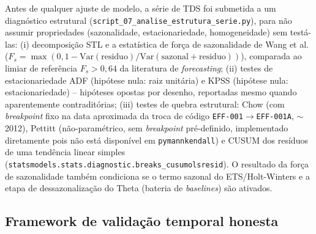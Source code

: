 Antes de qualquer ajuste de modelo, a série de TDS foi submetida a um diagnóstico estrutural (\texttt{script\_07\_analise\_estrutura\_serie.py}), para não assumir propriedades (sazonalidade, estacionariedade, homogeneidade) sem testá-las: (i) decomposição STL e a estatística de força de sazonalidade de Wang et al. ($F_s = \max(0, 1 - \mathrm{Var}(\mathrm{residuo})/\mathrm{Var}(\mathrm{sazonal}+\mathrm{residuo}))$), comparada ao limiar de referência $F_s > 0{,}64$ da literatura de \textit{forecasting}; (ii) testes de estacionariedade ADF (hipótese nula: raiz unitária) e KPSS (hipótese nula: estacionariedade) -- hipóteses opostas por desenho, reportadas mesmo quando aparentemente contraditórias; (iii) testes de quebra estrutural: Chow (com \textit{breakpoint} fixo na data aproximada da troca de código \texttt{EFF-001}$\to$\texttt{EFF-001A}, $\sim$2012), Pettitt (não-paramétrico, sem \textit{breakpoint} pré-definido, implementado diretamente pois não está disponível em \texttt{pymannkendall}) e CUSUM dos resíduos de uma tendência linear simples (\texttt{statsmodels.stats.diagnostic.breaks\_cusumolsresid}). O resultado da força de sazonalidade também condiciona se o termo sazonal do ETS/Holt-Winters e a etapa de dessazonalização do Theta (bateria de \textit{baselines}) são ativados.

\subsection{Framework de validação temporal honesta}

